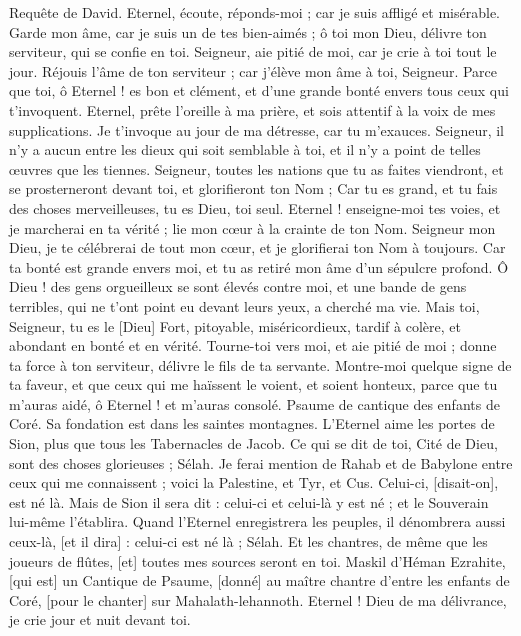 \begin{multicols}{2}
\VerseOne{}Requête de David. Eternel, écoute, réponds-moi ; car je suis affligé et misérable.
Garde mon âme, car je suis un de tes bien-aimés ; ô toi mon Dieu, délivre ton serviteur, qui se confie en toi.
Seigneur, aie pitié de moi, car je crie à toi tout le jour.
Réjouis l'âme de ton serviteur ; car j'élève mon âme à toi, Seigneur.
Parce que toi, ô Eternel ! es bon et clément, et d'une grande bonté envers tous ceux qui t'invoquent.
Eternel, prête l'oreille à ma prière, et sois attentif à la voix de mes supplications.
Je t'invoque au jour de ma détresse, car tu m'exauces.
Seigneur, il n'y a aucun entre les dieux qui soit semblable à toi, et il n'y a point de telles œuvres que les tiennes.
Seigneur, toutes les nations que tu as faites viendront, et se prosterneront devant toi, et glorifieront ton Nom ;
Car tu es grand, et tu fais des choses merveilleuses, tu es Dieu, toi seul.
Eternel ! enseigne-moi tes voies, et je marcherai en ta vérité ; lie mon cœur à la crainte de ton Nom.
Seigneur mon Dieu, je te célébrerai de tout mon cœur, et je glorifierai ton Nom à toujours.
Car ta bonté est grande envers moi, et tu as retiré mon âme d'un sépulcre profond.
Ô Dieu ! des gens orgueilleux se sont élevés contre moi, et une bande de gens terribles, qui ne t'ont point eu devant leurs yeux, a cherché ma vie.
Mais toi, Seigneur, tu es le [Dieu] Fort, pitoyable, miséricordieux, tardif à colère, et abondant en bonté et en vérité.
Tourne-toi vers moi, et aie pitié de moi ; donne ta force à ton serviteur, délivre le fils de ta servante.
Montre-moi quelque signe de ta faveur, et que ceux qui me haïssent le voient, et soient honteux, parce que tu m'auras aidé, ô Eternel ! et m'auras consolé.
\VerseOne{}Psaume de cantique des enfants de Coré. Sa fondation est dans les saintes montagnes.
L'Eternel aime les portes de Sion, plus que tous les Tabernacles de Jacob.
Ce qui se dit de toi, Cité de Dieu, sont des choses glorieuses ; Sélah.
Je ferai mention de Rahab et de Babylone entre ceux qui me connaissent ; voici la Palestine, et Tyr, et Cus. Celui-ci, [disait-on], est né là.
Mais de Sion il sera dit : celui-ci et celui-là y est né ; et le Souverain lui-même l'établira.
Quand l'Eternel enregistrera les peuples, il dénombrera aussi ceux-là, [et il dira] : celui-ci est né là ; Sélah.
Et les chantres, de même que les joueurs de flûtes, [et] toutes mes sources seront en toi.
\VerseOne{}Maskil d'Héman Ezrahite, [qui est] un Cantique de Psaume, [donné] au maître chantre d'entre les enfants de Coré, [pour le chanter] sur Mahalath-lehannoth. Eternel ! Dieu de ma délivrance, je crie jour et nuit devant toi.

\end{multicols}
